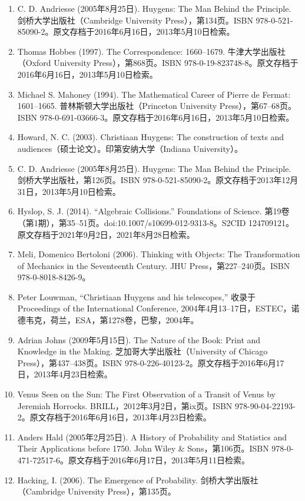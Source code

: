 \begin{enumerate}
\item C. D. Andriesse (2005年8月25日). Huygens: The Man Behind the Principle. 剑桥大学出版社（Cambridge University Press），第134页。ISBN 978-0-521-85090-2。原文存档于2016年6月16日，2013年5月10日检索。
\item Thomas Hobbes (1997). The Correspondence: 1660–1679. 牛津大学出版社（Oxford University Press），第868页。ISBN 978-0-19-823748-8。原文存档于2016年6月16日，2013年5月10日检索。
\item Michael S. Mahoney (1994). The Mathematical Career of Pierre de Fermat: 1601–1665. 普林斯顿大学出版社（Princeton University Press），第67–68页。ISBN 978-0-691-03666-3。原文存档于2016年6月16日，2013年5月10日检索。
\item Howard, N. C. (2003). Christiaan Huygens: The construction of texts and audiences（硕士论文）。印第安纳大学（Indiana University）。
\item C. D. Andriesse (2005年8月25日). Huygens: The Man Behind the Principle. 剑桥大学出版社，第126页。ISBN 978-0-521-85090-2。原文存档于2013年12月31日，2013年5月10日检索。
\item Hyslop, S. J. (2014). “Algebraic Collisions.” Foundations of Science. 第19卷（第1期），第35–51页。doi:10.1007/s10699-012-9313-8。S2CID 124709121。原文存档于2021年9月2日，2021年8月28日检索。
\item Meli, Domenico Bertoloni (2006). Thinking with Objects: The Transformation of Mechanics in the Seventeenth Century. JHU Press，第227–240页。ISBN 978-0-8018-8426-9。
\item Peter Louwman, “Christiaan Huygens and his telescopes,” 收录于 Proceedings of the International Conference, 2004年4月13–17日，ESTEC，诺德韦克，荷兰，ESA，第1278卷，巴黎，2004年。
\item Adrian Johns (2009年5月15日). The Nature of the Book: Print and Knowledge in the Making. 芝加哥大学出版社（University of Chicago Press），第437–438页。ISBN 978-0-226-40123-2。原文存档于2016年6月17日，2013年4月23日检索。
\item Venus Seen on the Sun: The First Observation of a Transit of Venus by Jeremiah Horrocks. BRILL，2012年3月2日，第ix页。ISBN 978-90-04-22193-2。原文存档于2016年6月16日，2013年4月23日检索。
\item Anders Hald (2005年2月25日). A History of Probability and Statistics and Their Applications before 1750. John Wiley & Sons，第106页。ISBN 978-0-471-72517-6。原文存档于2016年6月17日，2013年5月11日检索。
\item Hacking, I. (2006). The Emergence of Probability. 剑桥大学出版社（Cambridge University Press），第135页。

\end{enumerate}
